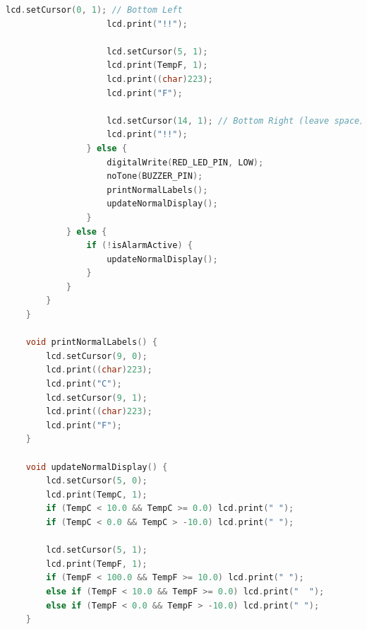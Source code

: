 \documentclass[10pt]{article}
\begin{document}
\begin{lstlisting}[language=C++, caption={Arduino sketch for running average temperature monitoring}]
					lcd.setCursor(0, 1); // Bottom Left
					lcd.print("!!");
	
					lcd.setCursor(5, 1);
					lcd.print(TempF, 1);
					lcd.print((char)223);
					lcd.print("F");
	
					lcd.setCursor(14, 1); // Bottom Right (leave space)
					lcd.print("!!");
				} else {
					digitalWrite(RED_LED_PIN, LOW);
					noTone(BUZZER_PIN);
					printNormalLabels();
					updateNormalDisplay();
				}
			} else {
				if (!isAlarmActive) {
					updateNormalDisplay();
				}
			}
		}
	}
	
	void printNormalLabels() {
		lcd.setCursor(9, 0);
		lcd.print((char)223);
		lcd.print("C");
		lcd.setCursor(9, 1);
		lcd.print((char)223);
		lcd.print("F");
	}
	
	void updateNormalDisplay() {
		lcd.setCursor(5, 0);
		lcd.print(TempC, 1);
		if (TempC < 10.0 && TempC >= 0.0) lcd.print(" ");
		if (TempC < 0.0 && TempC > -10.0) lcd.print(" ");
	
		lcd.setCursor(5, 1);
		lcd.print(TempF, 1);
		if (TempF < 100.0 && TempF >= 10.0) lcd.print(" ");
		else if (TempF < 10.0 && TempF >= 0.0) lcd.print("  ");
		else if (TempF < 0.0 && TempF > -10.0) lcd.print(" ");
	}
\end{lstlisting}
\end{document}

